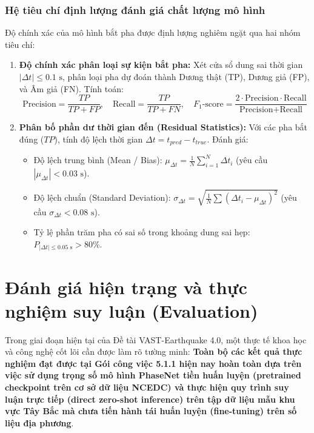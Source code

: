 \documentclass[preprint,1p]{elsarticle}
\begin{document}
\subsubsection{Hệ tiêu chí định lượng đánh giá chất lượng mô hình}
Độ chính xác của mô hình bắt pha được định lượng nghiêm ngặt qua hai nhóm tiêu chí:
\begin{enumerate}
    \item \textbf{Độ chính xác phân loại sự kiện bắt pha:} Xét cửa sổ dung sai thời gian $|\Delta t| \le 0.1\text{ s}$, phân loại pha dự đoán thành Dương thật (TP), Dương giả (FP), và Âm giả (FN). Tính toán:
    \begin{equation}
    \text{Precision} = \frac{TP}{TP + FP}, \quad \text{Recall} = \frac{TP}{TP + FN}, \quad F_1\text{-score} = \frac{2 \cdot \text{Precision} \cdot \text{Recall}}{\text{Precision} + \text{Recall}}
    \label{eq:eval_metrics}
    \end{equation}
    \item \textbf{Phân bố phần dư thời gian đến (Residual Statistics):} Với các pha bắt đúng ($TP$), tính độ lệch thời gian $\Delta t = t_{pred} - t_{true}$. Đánh giá:
    \begin{itemize}
        \item Độ lệch trung bình (Mean / Bias): $\mu_{\Delta t} = \frac{1}{N} \sum_{i=1}^{N} \Delta t_i$ (yêu cầu $|\mu_{\Delta t}| < 0.03\text{ s}$).
        \item Độ lệch chuẩn (Standard Deviation): $\sigma_{\Delta t} = \sqrt{\frac{1}{N}\sum (\Delta t_i - \mu_{\Delta t})^2}$ (yêu cầu $\sigma_{\Delta t} < 0.08\text{ s}$).
        \item Tỷ lệ phần trăm pha có sai số trong khoảng dung sai hẹp: $P_{|\Delta t| \le 0.05\text{ s}} > 80\%$.
    \end{itemize}
\end{enumerate}

\section{Đánh giá hiện trạng và thực nghiệm suy luận (Evaluation)}
\label{sec:evaluation}

Trong giai đoạn hiện tại của Đề tài VAST-Earthquake 4.0, một thực tế khoa học và công nghệ cốt lõi cần được làm rõ tường minh: \textbf{Toàn bộ các kết quả thực nghiệm đạt được tại Gói công việc 5.1.1 hiện nay hoàn toàn dựa trên việc sử dụng trọng số mô hình PhaseNet tiền huấn luyện (pretrained checkpoint trên cơ sở dữ liệu NCEDC) và thực hiện quy trình suy luận trực tiếp (direct zero-shot inference) trên tập dữ liệu mẫu khu vực Tây Bắc mà chưa tiến hành tái huấn luyện (fine-tuning) trên số liệu địa phương}.
\end{document}

